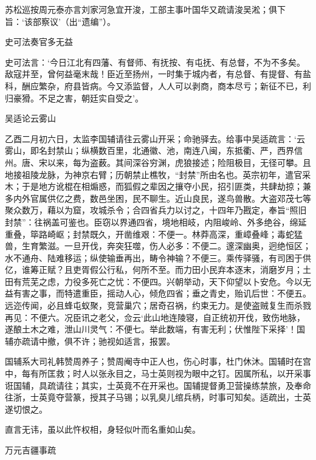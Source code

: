 \documentclass[]{article}
\begin{document}
苏松巡按周元泰亦言刘家河急宜开浚，工部主事叶国华又疏请浚吴淞；俱下旨：`该部察议'（出``遗编''）。

史可法奏官多无益

史可法言：`今日江北有四藩、有督师、有抚按、有屯抚、有总督，不为不多矣。敌寇并至，曾何益毫末哉！臣近至扬州，一时集于城内者，有总督、有提督、有盐科，酬应繁杂，府县皆病。今又添监督，人人可以剥商，商本尽亏；新征不已，利归豪猾。不足之害，朝廷实自受之'。

吴适论云雾山

乙酉二月初六日，太监李国辅请往云雾山开采；命驰驿去。给事中吴适疏言：`云雾山，即名封禁山；纵横数百里，北通徽、池，南连八闽，东抵衢、严，西界信州。唐、宋以来，每为盗薮。其间深谷穷渊，虎狼接述；险阻极目，无径可攀。且地接祖陵龙脉，为神京右臂；历朝禁止樵牧，``封禁''所由名也。英宗初年，遣官采木；于是地方讹棍在相煽惑，而狐假之辈因之攘夺小民，招引匪类，共肆劫掠；兼多内外官属供亿之费，数邑坐困，民不聊生。近山良民，遂鸟兽散。大盗邓茂七等聚众数万，藉以为窟，攻城杀令；合四省兵力以讨之，十四年乃戡定，奉旨``照旧封禁''：往祸盖可鉴也。臣窃以界通四省，境地相岐，内阻峻岭、外多绝谷，绵延重叠，筚路崎岖；封禁既久，开凿维艰：不便一。林莽高深，重嶂叠峰；毒蛇猛兽，生育繁滋。一旦开伐，奔突狂噬，伤人必多：不便二。邃深幽奥，迥绝恒区；水不通舟、陆难移运；纵使输垂再出，畴令神输？不便三。乘传驿骚，有司困于供亿，谁筹正赋？且吏胥假公行私，何所不至。而力田小民弃本逐末，消磨岁月；土田有荒芜之虑，力役多死亡之忧：不便四。兴朝举动，天下仰望以卜安危。今以无益有害之事，而特遣重臣，摇动人心，倾危四省；垂之青史，贻讥后世：不便五。远迩传闻，必且蜂屯蚁聚，竞营巢穴；居奇召祸，约束无力。是使盗贼复生而杀戮再见：不便六。况臣讯之老父，佥云`此山地连陵寝，自正统初开伐，致伤地脉，遂酿土木之难，泄山川灵气：不便七。举此数端，有害无利；伏惟陛下采择'！国辅亦疏请中撤，俱不许；驰视如适言，报罢。

国辅系大司礼韩赞周养子；赞周阉寺中正人也，伤心时事，杜门休沐。国辅时在宫中，每有所匡救；时人以张永目之，马士英则视为眼中之钉。因属所私，以开采事诳国辅，具疏请往；其实，士英竟不在开采也。国辅提督勇卫营操练禁旅，及奉命往浙，士英竟夺营篆，授其子马锡；以乳臭儿绾兵柄，时事可知矣。适疏出，士英遂切恨之。

直言无讳，虽以此忤权相，身轻似叶而名重如山矣。

万元吉疆事疏
\end{document}
